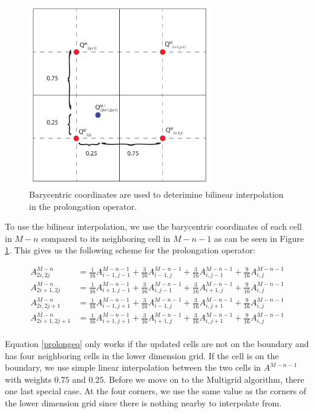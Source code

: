 \begin{figure}[ht!]
\centering
\includegraphics[width=80mm]{img/prolong.pdf}
\caption{Barycentric coordinates are used to deterimine bilinear interpolation in the prolongation operator.}
\label{prolong}
\end{figure}

To use the bilinear interpolation, we use the barycentric coordinates of each cell in $M-n$ compared to its neighboring cell in $M-n-1$ as can be seen in Figure \ref{prolong}. This gives us the following scheme for the prolongation operator:

\begin{equation}
\begin{split}
A^{M-n}_{2i,2j} &= \frac{1}{16} A^{M-n-1}_{i-1,j-1} +  \frac{3}{16} A^{M-n-1}_{i-1,j} +  \frac{3}{16} A^{M-n-1}_{i,j-1}+  \frac{9}{16} A^{M-n-1}_{i,j} \\ 
A^{M-n}_{2i + 1,2j} &= \frac{1}{16} A^{M-n-1}_{i+1,j-1} +  \frac{3}{16} A^{M-n-1}_{i,j-1} +  \frac{3}{16} A^{M-n-1}_{i+1,j}+  \frac{9}{16} A^{M-n-1}_{i,j} \\ 
A^{M-n}_{2i,2j+1} &= \frac{1}{16} A^{M-n-1}_{i-1,j+1} +  \frac{3}{16} A^{M-n-1}_{i-1,j} +  \frac{3}{16} A^{M-n-1}_{i,j+1}+  \frac{9}{16} A^{M-n-1}_{i,j} \\ 
A^{M-n}_{2i+1,2j+1} &= \frac{1}{16} A^{M-n-1}_{i+1,j+1} +  \frac{3}{16} A^{M-n-1}_{i+1,j} +  \frac{3}{16} A^{M-n-1}_{i,j+1}+  \frac{9}{16} A^{M-n-1}_{i,j} \\ 
\end{split}
\label{prolongeq}
\end{equation}

Equation \ref{prolongeq} only works if the updated cells are not on the boundary and has four neighboring cells in the lower dimension grid. If the cell is on the boundary, we use simple linear interpolation between the two cells in $A^{M-n-1}$ with weights $0.75$ and $0.25$. Before we move on to the Multigrid algorithm, there one last special case. At the four corners, we use the same value as the corners of the lower dimension grid since there is nothing nearby to interpolate from.
